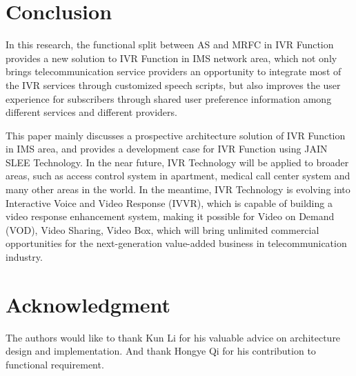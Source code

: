 \documentclass[10pt, conference, a4paper]{IEEEtran}
\begin{document}
\section{Conclusion}

In this research, the functional split between AS and MRFC in IVR Function provides a new solution to IVR Function in IMS network area, which not only brings telecommunication service providers an opportunity to integrate most of the IVR services through customized speech scripts, but also improves the user experience for subscribers through shared user preference information among different services and different providers.

This paper mainly discusses a prospective architecture solution of IVR Function in IMS area, and provides a development case for IVR Function using JAIN SLEE Technology. In the near future, IVR Technology will be applied to broader areas, such as access control system in apartment, medical call center system and many other areas in the world. In the meantime, IVR Technology is evolving into Interactive Voice and Video Response (IVVR), which is capable of building a video response enhancement system, making it possible for Video on Demand (VOD), Video Sharing, Video Box, which will bring unlimited commercial opportunities for the next-generation value-added business in telecommunication industry.

\section*{Acknowledgment}
The authors would like to thank Kun Li for his valuable advice on architecture design and implementation. And thank Hongye Qi for his contribution to functional requirement.




\end{document}
